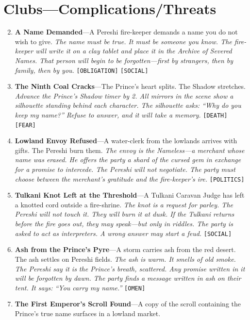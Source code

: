 \section*{Clubs---Complications/Threats}
\label{sec:pereshi-complications}
\begin{enumerate}
\setcounter{enumi}{1}
\item \textbf{A Name Demanded}---A Pereshi fire-keeper demands a name you do not wish to give.
  \hfill \textit{The name must be true. It must be someone you know. The fire-keeper will write it on a clay tablet and place it in the Archive of Severed Names. That person will begin to be forgotten---first by strangers, then by family, then by you.} \texttt{[OBLIGATION]} \texttt{[SOCIAL]}
\item \textbf{The Ninth Coal Cracks}---The Prince's heart splits. The Shadow stretches.
  \hfill \textit{Advance the Prince's Shadow timer by 2. All mirrors in the scene show a silhouette standing behind each character. The silhouette asks: ``Why do you keep my name?'' Refuse to answer, and it will take a memory.} \texttt{[DEATH]} \texttt{[FEAR]}
\item \textbf{Lowland Envoy Refused}---A water-clerk from the lowlands arrives with gifts. The Pereshi burn them.
  \hfill \textit{The envoy is the Nameless---a merchant whose name was erased. He offers the party a shard of the cursed gem in exchange for a promise to intercede. The Pereshi will not negotiate. The party must choose between the merchant's gratitude and the fire-keeper's ire.} \texttt{[POLITICS]}
\item \textbf{Tulkani Knot Left at the Threshold}---A Tulkani Caravan Judge has left a knotted cord outside a fire-shrine.
  \hfill \textit{The knot is a request for parley. The Pereshi will not touch it. They will burn it at dusk. If the Tulkani returns before the fire goes out, they may speak---but only in riddles. The party is asked to act as interpreters. A wrong answer may start a feud.} \texttt{[SOCIAL]}
\item \textbf{Ash from the Prince's Pyre}---A storm carries ash from the red desert. The ash settles on Pereshi fields.
  \hfill \textit{The ash is warm. It smells of old smoke. The Pereshi say it is the Prince's breath, scattered. Any promise written in it will be forgotten by dawn. The party finds a message written in ash on their tent. It says: ``You carry my name.''} \texttt{[OMEN]}
\item \textbf{The First Emperor's Scroll Found}---A copy of the scroll containing the Prince's true name surfaces in a lowland market.

\end{enumerate}

